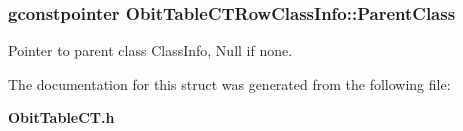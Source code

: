 \subsubsection{\setlength{\rightskip}{0pt plus 5cm}gconstpointer {\bf Obit\-Table\-CTRow\-Class\-Info::Parent\-Class}}\label{structObitTableCTRowClassInfo_o3}


Pointer to parent class Class\-Info, Null if none. 



The documentation for this struct was generated from the following file:\begin{CompactItemize}
\item 
{\bf Obit\-Table\-CT.h}\end{CompactItemize}
